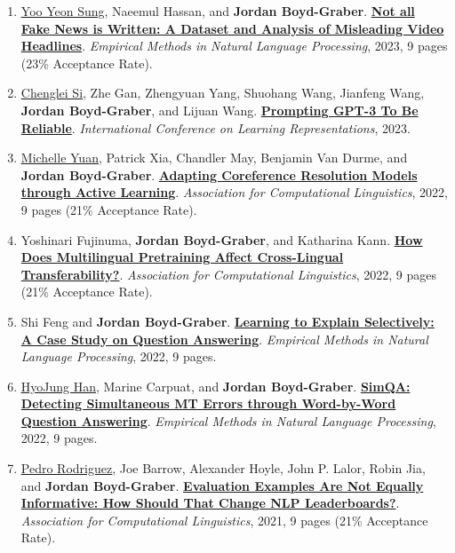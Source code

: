 {\begin{enumerate}
	 \item \underline{\href{http://yysung.github.io/}{Yoo Yeon Sung}}, Naeemul Hassan, and {\bf Jordan Boyd-Graber}.  {\bf \href{http://cs.umd.edu/~jbg//docs/2023_emnlp_videoheadline.pdf}{Not all Fake News is Written: A Dataset and Analysis of Misleading Video Headlines}}.  \emph{Empirical Methods in Natural Language Processing}, 2023, 9 pages (23\% Acceptance Rate).

	 \item \underline{\href{https://noviscl.github.io}{Chenglei Si}}, Zhe Gan, Zhengyuan Yang, Shuohang Wang, Jianfeng Wang, {\bf Jordan Boyd-Graber}, and Lijuan Wang.  {\bf \href{http://cs.umd.edu/~jbg//docs/2023_iclr_reliable.pdf}{Prompting GPT-3 To Be Reliable}}.  \emph{International Conference on Learning Representations}, 2023.

	 \item \underline{\href{https://forest-snow.github.io/}{Michelle Yuan}}, Patrick Xia, Chandler May, Benjamin Van Durme, and {\bf Jordan Boyd-Graber}.  {\bf \href{http://cs.umd.edu/~jbg//docs/2022_acl_alcoref.pdf}{Adapting Coreference Resolution Models through Active Learning}}.  \emph{Association for Computational Linguistics}, 2022, 9 pages (21\% Acceptance Rate).

	 \item Yoshinari Fujinuma, {\bf Jordan Boyd-Graber}, and Katharina Kann.  {\bf \href{http://cs.umd.edu/~jbg//docs/2022_acl_multilingbert.pdf}{How Does Multilingual Pretraining Affect Cross-Lingual Transferability?}}.  \emph{Association for Computational Linguistics}, 2022, 9 pages (21\% Acceptance Rate).

	 \item Shi Feng and {\bf Jordan Boyd-Graber}.  {\bf \href{http://cs.umd.edu/~jbg//docs/2022_emnlp_augment.pdf}{Learning to Explain Selectively: A Case Study on Question Answering}}.  \emph{Empirical Methods in Natural Language Processing}, 2022, 9 pages.

	 \item \underline{\href{https://h-j-han.github.io/}{HyoJung Han}}, Marine Carpuat, and {\bf Jordan Boyd-Graber}.  {\bf \href{http://cs.umd.edu/~jbg//docs/2022_emnlp_simqa.pdf}{SimQA: Detecting Simultaneous MT Errors through Word-by-Word Question Answering}}.  \emph{Empirical Methods in Natural Language Processing}, 2022, 9 pages.

	 \item \underline{\href{https://www.pedro.ai/}{Pedro Rodriguez}}, Joe Barrow, Alexander Hoyle, John P. Lalor, Robin Jia, and {\bf Jordan Boyd-Graber}.  {\bf \href{http://cs.umd.edu/~jbg//docs/2021_acl_leaderboard.pdf}{Evaluation Examples Are Not Equally Informative: How Should That Change NLP Leaderboards?}}.  \emph{Association for Computational Linguistics}, 2021, 9 pages (21\% Acceptance Rate).


\end{enumerate}}
